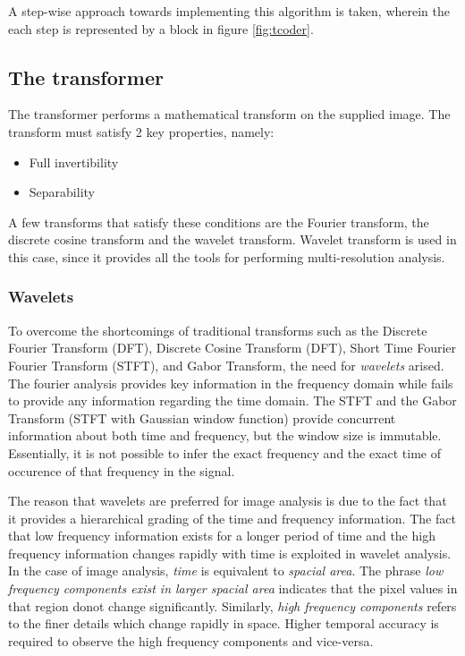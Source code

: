 \documentclass[./A14_Report.tex]{subfiles}
\begin{document}
A step-wise approach towards implementing this algorithm is taken, wherein
the each step is represented by a block in figure \ref{fig:tcoder}.

\pagebreak

\subsection{The transformer}
\label{sec:the_transformer}

The transformer performs a mathematical transform on the supplied image. The
transform must satisfy 2 key properties, namely:
\begin{itemize}
    \item Full invertibility
    \item Separability
\end{itemize}

A few transforms that satisfy these conditions are the Fourier transform, the
discrete cosine transform and the wavelet transform. Wavelet transform is used 
in this case, since it provides all the tools for performing multi-resolution analysis.

\subsubsection{Wavelets}%
\label{sec:theory_of_wavelets}

To overcome the shortcomings of traditional transforms such as the 
Discrete Fourier Transform (DFT), Discrete Cosine Transform (DFT), 
Short Time Fourier Fourier Transform (STFT), and Gabor Transform, 
the need for \textit{wavelets} arised. The fourier analysis provides key information 
in the frequency domain while fails to provide any information regarding the time domain.
The STFT and the Gabor Transform (STFT with Gaussian window function) provide concurrent
information about both time and frequency, but the window size is immutable.
Essentially, it is not possible to infer the exact frequency and the exact time of 
occurence of that frequency in the signal.

\par

The reason that wavelets are preferred for image analysis is due to the fact that it 
provides a hierarchical grading of the time and frequency information. The fact that low
frequency information exists for a longer period of time and the high frequency information
changes rapidly with time is exploited in wavelet analysis. In the case of image analysis, 
\textit{time} is equivalent to \textit{spacial area}. The phrase \textit{low frequency 
components exist in larger spacial area} indicates that the pixel values in that region
donot change significantly. Similarly, \textit{high frequency components} refers to the finer 
details which change rapidly in space. 
Higher temporal accuracy is required to observe the high frequency components and vice-versa.
\end{document}
